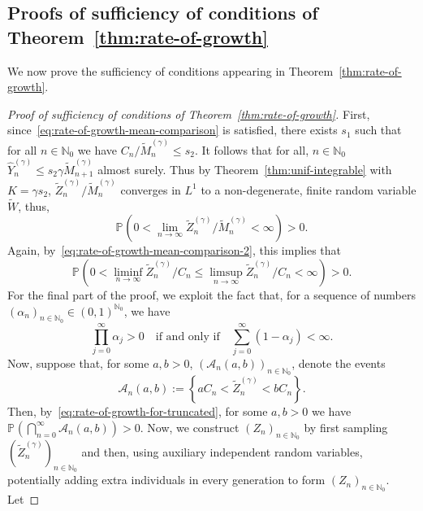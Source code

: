 \documentclass[12pt]{article}
\theoremstyle{definition}
\newcommand{\Prob}[2][]{\ensuremath{\mathbb{P}_{#1} \left(#2 \right)}}
\begin{document}
 \subsection{Proofs of sufficiency of conditions of Theorem~\ref{thm:rate-of-growth}}
 We now prove the sufficiency of conditions appearing in Theorem~\ref{thm:rate-of-growth}.

\begin{proof}[Proof of sufficiency of conditions of Theorem~\ref{thm:rate-of-growth}]
First, since~\eqref{eq:rate-of-growth-mean-comparison} is satisfied, there exists $s_1$ such that for all $n\in \mathbb{N}_0$ we have $C_{n}/\tilde{M}^{(\gamma)}_{n} \leq s_2$. It follows that for all, $n \in \mathbb{N}_0$ $\widehat{Y}^{(\gamma)}_{n} \leq s_{2} \gamma \tilde{M}^{(\gamma)}_{n+1}$ almost surely. Thus by Theorem~\ref{thm:unif-integrable} with $K = \gamma s_2$, $\tilde{Z}^{(\gamma)}_{n}/\tilde{M}^{(\gamma)}_{n}$ converges in $L^1$ to a non-degenerate, finite random variable $\tilde{W}$, thus, \[\Prob{0 < \lim_{n \to \infty} \tilde{Z}^{(\gamma)}_{n}/\tilde{M}^{(\gamma)}_{n} < \infty} > 0.\] Again, by~\eqref{eq:rate-of-growth-mean-comparison-2}, this implies that 
\begin{equation} \label{eq:rate-of-growth-for-truncated}
\Prob{0 < \liminf_{n \to \infty} \tilde{Z}^{(\gamma)}_{n}/C_n \leq \limsup_{n \to \infty} \tilde{Z}^{(\gamma)}_{n}/C_n <  \infty} > 0. 
\end{equation}
For the final part of the proof, we exploit the fact that, for a sequence of numbers $(\alpha_{n})_{n \in \mathbb{N}_0} \in (0,1)^{\mathbb{N}_0}$, we have 
\begin{equation} \label{eq:product-identity}
    \prod_{j=0}^{\infty} \alpha_{j} > 0 \quad \text{if and only if} \quad \sum_{j=0}^{\infty} (1 - \alpha_{j}) < \infty. 
\end{equation}
Now, suppose that, for some $a,b > 0$, $(\mathcal{A}_{n}(a,b))_{n \in \mathbb{N}_0}$,  denote the events 
\begin{equation} \label{eq:rate-at-step-n}
\mathcal{A}_{n}(a,b) := \left\{a C_n < \tilde{Z}^{(\gamma)}_{n}  < b C_{n} \right\}. 
\end{equation}
Then, by~\eqref{eq:rate-of-growth-for-truncated}, for some $a, b > 0$ we have $\Prob{\bigcap_{n=0}^{\infty} \mathcal{A}_{n}(a,b)} > 0$. Now, we construct $(Z_{n})_{n \in \mathbb{N}_0}$ by first sampling $(\tilde{Z}^{(\gamma)}_{n})_{n \in \mathbb{N}_0}$ and then, using auxiliary independent random variables, potentially adding extra individuals in every generation to form $(Z_{n})_{n \in \mathbb{N}_0}$. Let 

\end{proof}
\end{document}
